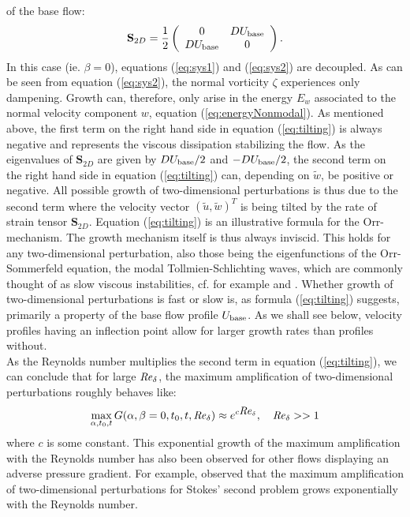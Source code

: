 \documentclass{jfm}
\newcommand\be{\begin{equation}}
\newcommand\ee{\end{equation}}
\newcommand\base{{\rm base}}
\newcommand\Rey{\mbox{\textit{Re}}}  %
\begin{document}
of the base flow:
\be
\mathbf{S}_{2D} = \frac{1}{2} \left( \begin{array}{cc} 0 & D U_\base \\ D U_\base & 0 \end{array} \right).
\ee
In this case (ie. $\beta = 0$), equations (\ref{eq:sys1}) and (\ref{eq:sys2}) are decoupled. As can
be seen from equation (\ref{eq:sys2}),
the normal vorticity $ \zeta $ experiences only dampening. Growth
can, therefore, only arise in the energy $ E_w $
associated to the normal velocity component $ w $, equation (\ref{eq:energyNonmodal}). As mentioned above, the first term on the right hand side in equation (\ref{eq:tilting}) is always negative and
represents the viscous dissipation stabilizing the flow. As the eigenvalues
of $ \mathbf{S}_{2D} $ are given by $ D U_\base/2 $ and $ - D U_\base/2 $, the second term on
the right hand side in equation (\ref{eq:tilting}) can, depending on $ \tilde{w} $, be positive
or negative. All possible growth of two-dimensional perturbations is thus due
to the second term where
the velocity vector $ \left( \tilde{u} , \tilde{w} \right)^T $ is being tilted by the
rate of strain tensor $ \mathbf{S}_{2D} $. Equation (\ref{eq:tilting}) is
an illustrative formula for the Orr-mechanism. The growth mechanism itself is thus always inviscid. This
holds for any two-dimensional perturbation, also those being the eigenfunctions
of the Orr-Sommerfeld equation, the modal Tollmien-Schlichting waves, which
are commonly thought of as slow viscous instabilities, cf. for example
\citep{Jimenez2013} and \citep{BrandtSchlatterHenningson2004}.
Whether growth of two-dimensional perturbations is fast or slow is, as
formula (\ref{eq:tilting}) suggests, primarily
a property of the base flow profile $ U_\base $. As we shall see below, 
velocity profiles having an inflection point allow for larger growth rates
than profiles without.\\

As the Reynolds number multiplies the second term in
equation (\ref{eq:tilting}), we can conclude that
for large $ \Rey_\delta $, the maximum amplification
of two-dimensional perturbations roughly behaves like:
\be
\max_{\alpha,t_0,t} G(\alpha,\beta=0,t_0,t,\Rey_\delta) \approx
e^{c \Rey_\delta}, \quad \Rey_\delta >> 1 \label{eq:TSgrowth}
\ee
where $ c $ is some constant. This exponential growth of the maximum amplification
with the Reynolds number has also been observed for other flows displaying an adverse
pressure gradient. For example, \citet{Biau2016} observed that the maximum amplification
of two-dimensional perturbations for Stokes' second problem grows exponentially
with the Reynolds number.
\end{document}
